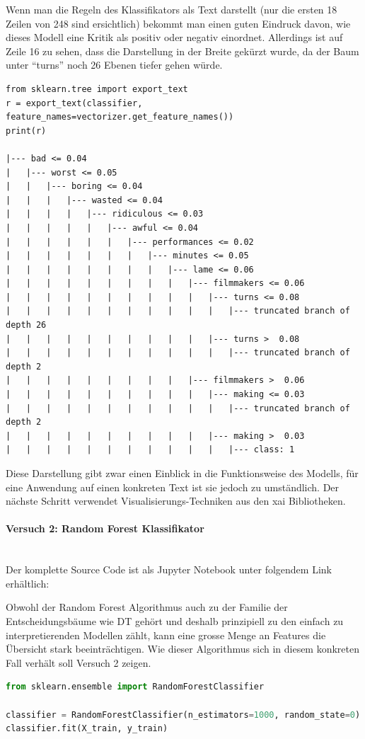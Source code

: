 \documentclass[
  12pt, %
  a4paper, %
  oneside, %
  openany, 
  numbers=noenddot, %
  BCOR=5mm, %
  parskip=half*, %
  thesis, %
]{bfhbook}
\newcommand{\parag}[1]{\paragraph*{#1}\mbox{}\\}
\begin{document}
Wenn man die Regeln des Klassifikators als Text darstellt (nur die ersten 18 Zeilen von 248 sind ersichtlich) bekommt man einen guten Eindruck davon, wie dieses Modell eine Kritik als positiv oder negativ einordnet. Allerdings ist auf Zeile 16 zu sehen, dass die Darstellung in der Breite gekürzt wurde, da der Baum unter ``turns'' noch 26 Ebenen tiefer gehen würde.
\begin{lstlisting}
from sklearn.tree import export_text
r = export_text(classifier, feature_names=vectorizer.get_feature_names())
print(r)

|--- bad <= 0.04
|   |--- worst <= 0.05
|   |   |--- boring <= 0.04
|   |   |   |--- wasted <= 0.04
|   |   |   |   |--- ridiculous <= 0.03
|   |   |   |   |   |--- awful <= 0.04
|   |   |   |   |   |   |--- performances <= 0.02
|   |   |   |   |   |   |   |--- minutes <= 0.05
|   |   |   |   |   |   |   |   |--- lame <= 0.06
|   |   |   |   |   |   |   |   |   |--- filmmakers <= 0.06
|   |   |   |   |   |   |   |   |   |   |--- turns <= 0.08
|   |   |   |   |   |   |   |   |   |   |   |--- truncated branch of depth 26
|   |   |   |   |   |   |   |   |   |   |--- turns >  0.08
|   |   |   |   |   |   |   |   |   |   |   |--- truncated branch of depth 2
|   |   |   |   |   |   |   |   |   |--- filmmakers >  0.06
|   |   |   |   |   |   |   |   |   |   |--- making <= 0.03
|   |   |   |   |   |   |   |   |   |   |   |--- truncated branch of depth 2
|   |   |   |   |   |   |   |   |   |   |--- making >  0.03
|   |   |   |   |   |   |   |   |   |   |   |--- class: 1
\end{lstlisting}
Diese Darstellung gibt zwar einen Einblick in die Funktionsweise des Modells, für eine Anwendung auf einen konkreten Text ist sie jedoch zu umständlich. Der nächste Schritt verwendet Visualisierungs-Techniken aus den \Gls{xai} Bibliotheken.

\parag{Versuch 2: Random Forest Klassifikator}
Der komplette Source Code ist als Jupyter Notebook unter folgendem Link erhältlich: \parencite{textClassEli5}

Obwohl der Random Forest Algorithmus auch zu der Familie der Entscheidungsbäume wie \Gls{DT} gehört und deshalb prinzipiell zu den einfach zu interpretierenden Modellen zählt, kann eine grosse Menge an Features die Übersicht stark beeinträchtigen. Wie dieser Algorithmus sich in diesem konkreten Fall verhält soll Versuch 2 zeigen.

\begin{lstlisting}[language=Python]
from sklearn.ensemble import RandomForestClassifier

classifier = RandomForestClassifier(n_estimators=1000, random_state=0)
classifier.fit(X_train, y_train)
\end{lstlisting}
\end{document}
